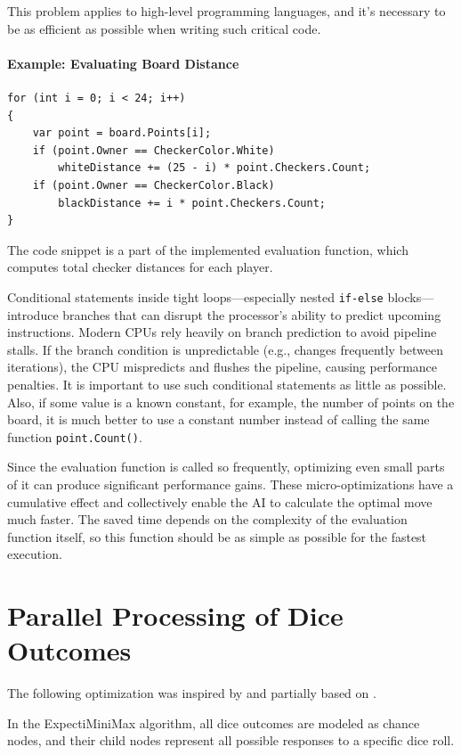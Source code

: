 This problem applies to high-level programming languages, and it's necessary to be as efficient as possible when writing such critical code.

\paragraph{Example: Evaluating Board Distance}

\begin{verbatim}
for (int i = 0; i < 24; i++)
{
    var point = board.Points[i];
    if (point.Owner == CheckerColor.White)
        whiteDistance += (25 - i) * point.Checkers.Count;
    if (point.Owner == CheckerColor.Black)
        blackDistance += i * point.Checkers.Count;
}
\end{verbatim}

The code snippet is a part of the implemented evaluation function, which computes total checker distances for each player.

Conditional statements inside tight loops—especially nested \texttt{if-else} blocks—introduce branches that can disrupt the processor's ability to predict upcoming instructions. Modern CPUs rely heavily on branch prediction to avoid pipeline stalls. If the branch condition is unpredictable (e.g., changes frequently between iterations), the CPU mispredicts and flushes the pipeline, causing performance penalties. It is important to use such conditional statements as little as possible. Also, if some value is a known constant, for example, the number of points on the board, it is much better to use a constant number instead of calling the same function \verb|point.Count()|.

Since the evaluation function is called so frequently, optimizing even small parts of it can produce significant performance gains. These micro-optimizations have a cumulative effect and collectively enable the AI to calculate the optimal move much faster. The saved time depends on the complexity of the evaluation function itself, so this function should be as simple as possible for the fastest execution.

\newpage
\section{Parallel Processing of Dice Outcomes}
The following optimization was inspired by and partially based on \cite{Lamanosa2013ExpectimaxET}.

In the ExpectiMiniMax algorithm, all dice outcomes are modeled as chance nodes, and their child nodes represent all possible responses to a specific dice roll.

